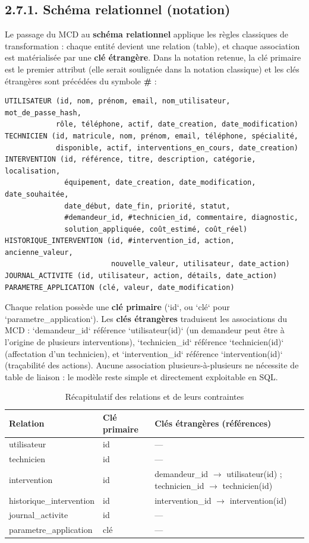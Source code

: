 \documentclass[11pt,a4paper]{report}
\begin{document}
\subsection*{2.7.1. Schéma relationnel (notation)}

Le passage du MCD au \textbf{schéma relationnel} applique les règles classiques de transformation : chaque entité devient une relation (table), et chaque association est matérialisée par une \textbf{clé étrangère}. Dans la notation retenue, la clé primaire est le premier attribut (elle serait soulignée dans la notation classique) et les clés étrangères sont précédées du symbole \textbf{\#} :
\begin{lstlisting}
UTILISATEUR (id, nom, prénom, email, nom_utilisateur, mot_de_passe_hash,
            rôle, téléphone, actif, date_creation, date_modification)
TECHNICIEN (id, matricule, nom, prénom, email, téléphone, spécialité,
            disponible, actif, interventions_en_cours, date_creation)
INTERVENTION (id, référence, titre, description, catégorie, localisation,
              équipement, date_creation, date_modification, date_souhaitée,
              date_début, date_fin, priorité, statut,
              #demandeur_id, #technicien_id, commentaire, diagnostic,
              solution_appliquée, coût_estimé, coût_réel)
HISTORIQUE_INTERVENTION (id, #intervention_id, action, ancienne_valeur,
                         nouvelle_valeur, utilisateur, date_action)
JOURNAL_ACTIVITE (id, utilisateur, action, détails, date_action)
PARAMETRE_APPLICATION (clé, valeur, date_modification)
\end{lstlisting}

Chaque relation possède une \textbf{clé primaire} (`id`, ou `clé` pour `parametre\_application`). Les \textbf{clés étrangères} traduisent les associations du MCD : `demandeur\_id` référence `utilisateur(id)` (un demandeur peut être à l'origine de plusieurs interventions), `technicien\_id` référence `technicien(id)` (affectation d'un technicien), et `intervention\_id` référence `intervention(id)` (traçabilité des actions). Aucune association plusieurs-à-plusieurs ne nécessite de table de liaison : le modèle reste simple et directement exploitable en SQL.
\begin{table}[htbp]\centering\small
\begin{tabularx}{\textwidth}{|X|X|X|}
\hline\rowcolor{hdr}\textbf{Relation} & \textbf{Clé primaire} & \textbf{Clés étrangères (références)}\\ \hline
utilisateur & id & ---\\ \hline
technicien & id & ---\\ \hline
intervention & id & demandeur\_id $\rightarrow$ utilisateur(id) ; technicien\_id $\rightarrow$ technicien(id)\\ \hline
historique\_intervention & id & intervention\_id $\rightarrow$ intervention(id)\\ \hline
journal\_activite & id & ---\\ \hline
parametre\_application & clé & ---\\ \hline
\end{tabularx}
\caption{Récapitulatif des relations et de leurs contraintes}
\end{table}
\end{document}
